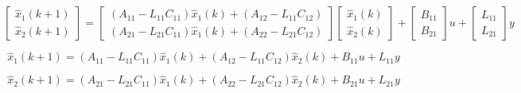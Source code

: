 \begin{equation}
    \begin{bmatrix}
        \hat{x}_1(k+1) \\
        \hat{x}_2(k+1)
    \end{bmatrix}
    =
    \begin{bmatrix}
        (A_{11} - L_{11} C_{11}) \hat{x}_1(k) + (A_{12} - L_{11} C_{12}) \\
        (A_{21} - L_{21} C_{11}) \hat{x}_1(k) + (A_{22} - L_{21} C_{12})
    \end{bmatrix}
    \begin{bmatrix}
        \hat{x}_1(k) \\
        \hat{x}_2(k)
    \end{bmatrix}
    +
    \begin{bmatrix}
        B_{11} \\
        B_{21}
    \end{bmatrix} u
    +
    \begin{bmatrix}
        L_{11} \\
        L_{21}
    \end{bmatrix} y
\end{equation}
    
\begin{equation}
    \hat{x}_1(k+1) = (A_{11} - L_{11} C_{11}) \hat{x}_1(k) + (A_{12} - L_{11} C_{12}) \hat{x}_2(k) + B_{11} u + L_{11} y
\end{equation}
 
\vspace{-0.5cm}
\begin{equation}
    \hat{x}_2(k+1) = (A_{21} - L_{21} C_{11}) \hat{x}_1(k) + (A_{22} - L_{21} C_{12}) \hat{x}_2(k) + B_{21} u + L_{21} y
\end{equation}
    